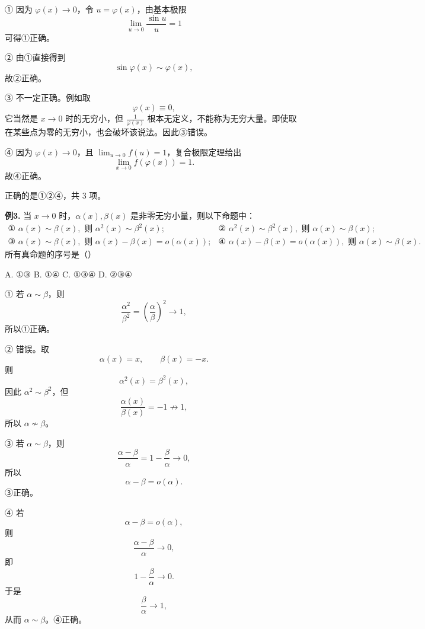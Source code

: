 \begin{solutionblock}

① 因为 \(\varphi(x)\to0\)，令 \(u=\varphi(x)\)，由基本极限
\[
\lim_{u\to0}\frac{\sin u}{u}=1
\]
可得①正确。

② 由①直接得到
\[
\sin\varphi(x)\sim\varphi(x),
\]
故②正确。

③ 不一定正确。例如取
\[
\varphi(x)\equiv0,
\]
它当然是 \(x\to0\) 时的无穷小，但 \(\frac1{\varphi(x)}\) 根本无定义，不能称为无穷大量。即使取在某些点为零的无穷小，也会破坏该说法。因此③错误。

④ 因为 \(\varphi(x)\to0\)，且 \(\lim_{u\to0}f(u)=1\)，复合极限定理给出
\[
\lim_{x\to0}f(\varphi(x))=1.
\]
故④正确。

正确的是①②④，共 3 项。

\end{solutionblock}

\begin{problemblock}
\textbf{例3.} 当 \(x\to0\) 时，\(\alpha(x),\beta(x)\) 是非零无穷小量，则以下命题中：
\[
\begin{array}{ll}
\text{① }\alpha(x)\sim\beta(x),\text{ 则 }\alpha^2(x)\sim\beta^2(x);&
\text{② }\alpha^2(x)\sim\beta^2(x),\text{ 则 }\alpha(x)\sim\beta(x);\\
\text{③ }\alpha(x)\sim\beta(x),\text{ 则 }\alpha(x)-\beta(x)=o(\alpha(x));&
\text{④ }\alpha(x)-\beta(x)=o(\alpha(x)),\text{ 则 }\alpha(x)\sim\beta(x).
\end{array}
\]
所有真命题的序号是（\quad）

A. ①③ \qquad B. ①④ \qquad C. ①③④ \qquad D. ②③④
\end{problemblock}

\begin{solutionblock}

① 若 \(\alpha\sim\beta\)，则
\[
\frac{\alpha^2}{\beta^2}=\left(\frac{\alpha}{\beta}\right)^2\to1,
\]
所以①正确。

② 错误。取
\[
\alpha(x)=x,\qquad \beta(x)=-x.
\]
则
\[
\alpha^2(x)=\beta^2(x),
\]
因此 \(\alpha^2\sim\beta^2\)，但
\[
\frac{\alpha(x)}{\beta(x)}=-1\not\to1,
\]
所以 \(\alpha\not\sim\beta\)。

③ 若 \(\alpha\sim\beta\)，则
\[
\frac{\alpha-\beta}{\alpha}=1-\frac{\beta}{\alpha}\to0,
\]
所以
\[
\alpha-\beta=o(\alpha).
\]
③正确。

④ 若
\[
\alpha-\beta=o(\alpha),
\]
则
\[
\frac{\alpha-\beta}{\alpha}\to0,
\]
即
\[
1-\frac{\beta}{\alpha}\to0.
\]
于是
\[
\frac{\beta}{\alpha}\to1,
\]
从而 \(\alpha\sim\beta\)。④正确。

\end{solutionblock}

